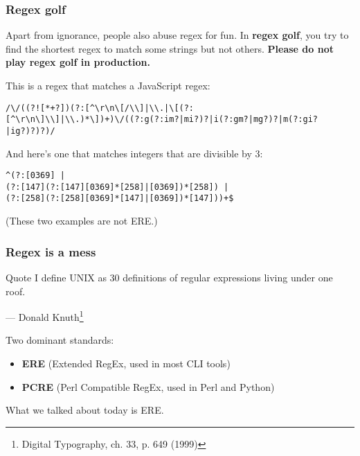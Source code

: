\begin{frame}[fragile]
\frametitle{Regex golf}
Apart from ignorance, people also abuse regex for fun. In \textbf{regex golf},
you try to find the shortest regex to match some strings but not others.
\textbf{Please do not play regex golf in production.}
\bigskip

This is a regex that matches a JavaScript regex:
\begin{lstlisting}
/\/((?![*+?])(?:[^\r\n\[/\\]|\\.|\[(?:[^\r\n\]\\]|\\.)*\])+)\/((?:g(?:im?|mi?)?|i(?:gm?|mg?)?|m(?:gi?|ig?)?)?)/
\end{lstlisting}

And here's one that matches integers that are divisible by 3:
\begin{lstlisting}
^(?:[0369] |
(?:[147](?:[147][0369]*[258]|[0369])*[258]) |
(?:[258](?:[258][0369]*[147]|[0369])*[147]))+$
\end{lstlisting}

(These two examples are not ERE.)
\end{frame}

\begin{frame}
\frametitle{Regex is a mess}
\begin{block}{Quote}
I define UNIX as 30 definitions of regular expressions living under one roof.
\begin{flushright}
    — Donald Knuth\footnote{Digital Typography, ch. 33, p. 649 (1999)}
\end{flushright}
\end{block}

Two dominant standards:
\begin{itemize}
    \item \textbf{ERE} (Extended RegEx, used in most CLI tools)
    \item \textbf{PCRE} (Perl Compatible RegEx, used in Perl and Python)
\end{itemize}
What we talked about today is ERE.
\end{frame}
